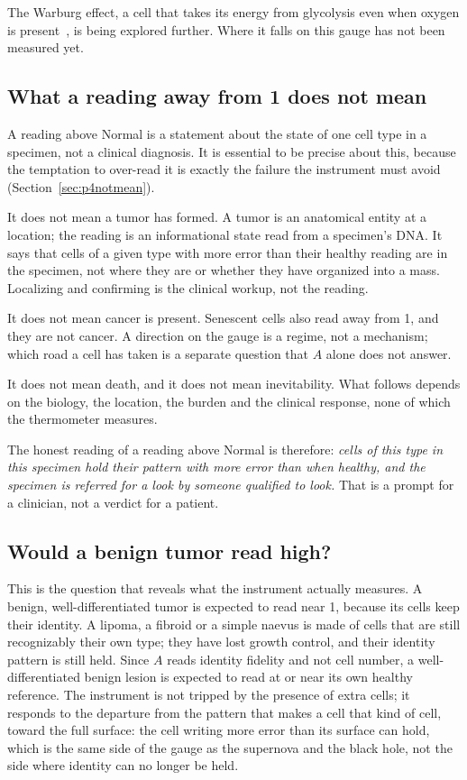 The Warburg effect, a cell that takes its energy from glycolysis even when oxygen is present~\cite{Warburg1956}, is being explored further.
Where it falls on this gauge has not been measured yet. \openprob

\subsection{What a reading away from 1 does not mean}

A reading above Normal is a statement about the state of one cell type in a specimen, not a clinical diagnosis. It is essential to be
precise about this, because the temptation to over-read it is exactly the failure the instrument must avoid
(Section~\ref{sec:p4notmean}).

It does not mean a tumor has formed. A tumor is an anatomical entity at a location; the reading is an informational state read from a
specimen's DNA. It says that cells of a given type with more error than their healthy reading are in the specimen, not where they are or
whether they have organized into a mass. Localizing and confirming is the clinical workup, not the reading.

It does not mean cancer is present. Senescent cells also read away from 1, and they are not cancer. A direction on the gauge is a regime,
not a mechanism; which road a cell has taken is a separate question that $A$ alone does not answer.

It does not mean death, and it does not mean inevitability. What follows depends on the biology, the location, the burden and the
clinical response, none of which the thermometer measures.

The honest reading of a reading above Normal is therefore: \emph{cells of this type in this specimen hold their pattern with more error
than when healthy, and the specimen is referred for a look by someone qualified to look.} That is a prompt for a clinician, not a verdict
for a patient.

\subsection{Would a benign tumor read high?}\label{sec:ag_benign}

This is the question that reveals what the instrument actually measures. A benign, well-differentiated tumor is expected to read near 1,
because its cells keep their identity. A lipoma, a fibroid or a simple naevus is made of cells that are still recognizably their own type;
they have lost growth control, and their identity pattern is still held. Since $A$ reads identity fidelity and not cell number, a well-differentiated benign lesion is
expected to read at or near its own healthy reference. The instrument is not tripped by the presence of extra cells; it responds to the
departure from the pattern that makes a cell that kind of cell, toward the full surface: the cell writing more
error than its surface can hold, which is the same side of the gauge as the supernova and the black hole, not the side where identity
can no longer be held. \prediction

